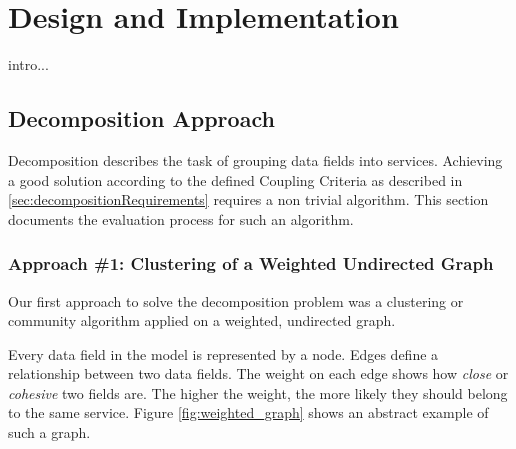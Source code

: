 
\chapter{Design and Implementation}
\label{cha:implementation}

intro...


\section{Decomposition Approach}

Decomposition describes the task of grouping data fields into services. Achieving a good solution according to the defined Coupling Criteria as described in \ref{sec:decompositionRequirements} requires a non trivial algorithm. This section documents the evaluation process for such an algorithm.

\subsection{Approach \#1: Clustering of a Weighted Undirected Graph}
\label{subsec:approach1_graph}

Our first approach to solve the decomposition problem was a clustering or community algorithm applied on a weighted, undirected graph.

Every data field in the model is represented by a node. Edges define a relationship between two data fields. The weight on each edge shows how \textit{close} or \textit{cohesive} two fields are. The higher the weight, the more likely they should belong to the same service. Figure \ref{fig:weighted_graph} shows an abstract example of such a graph.

